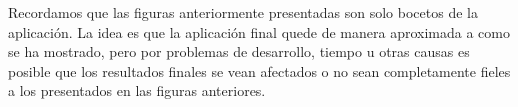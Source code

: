 Recordamos que las figuras anteriormente presentadas son solo bocetos de la aplicación. La idea es que la aplicación final quede de manera aproximada a como se ha mostrado, pero por problemas de desarrollo, tiempo u otras causas es posible que los resultados finales se vean afectados o no sean completamente fieles a los presentados en las figuras anteriores. 

